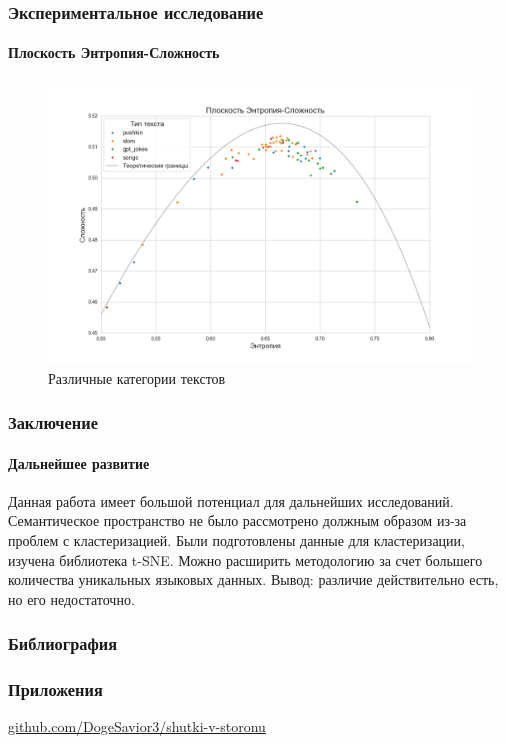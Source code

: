 \documentclass[aspectratio=169]{beamer}
\begin{document}
\begin{frame}
\frametitle{Экспериментальное исследование}
\framesubtitle{Плоскость Энтропия-Сложность}
	
	\begin{figure}[htbp]
            \centering
            \includegraphics[scale=0.3]{image8}
            \caption{Различные категории текстов}
            \label{fig:image6}
        \end{figure}

\end{frame}

\begin{frame}
\frametitle{Заключение}
\framesubtitle{Дальнейшее развитие}

Данная работа имеет большой потенциал для дальнейших исследований. Семантическое пространство не было рассмотрено должным образом из-за проблем с кластеризацией. Были подготовлены данные для кластеризации, изучена библиотека t-SNE. Можно расширить методологию за счет большего количества уникальных языковых данных. 
\newline
\newline
Вывод: различие действительно есть, но его недостаточно.
\end{frame}

\begin{frame}
\frametitle{Библиография}
	 
	 
\end{frame}

\begin{frame}
\frametitle{Приложения}
	\url{github.com/DogeSavior3/shutki-v-storonu}
\end{frame}
\end{document}
